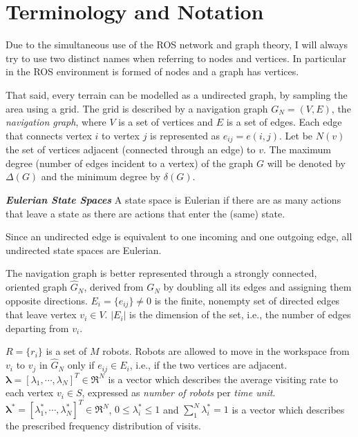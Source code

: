 \section{Terminology and Notation}\label{sec:terminology}

Due to the simultaneous use of the ROS network and graph theory, I will always try to use two distinct names when referring to nodes and vertices. In particular in the ROS environment is formed of nodes and a graph has vertices.

That said, every terrain can be modelled as a undirected graph, by sampling the area using a grid.
The grid is described by a navigation graph $G_N=(V,E)$, the \emph{navigation graph}, where $V$ is a set of vertices and $E$ is a set of edges. Each edge that connects vertex $i$ to vertex $j$ is represented as $e_{ij}=e(i,j)$. Let be $N(v)$ the set of vertices adjacent (connected through an edge) to $v$. The maximum degree (number of edges incident to a vertex) of the graph $G$ will be denoted by $\Delta (G)$ and the minimum degree by $\delta (G)$.


\theoremstyle{definition}
\begin{definition}{\textbf{\textit{Eulerian State Spaces}}}\label{cellDec}
A state space is Eulerian if  there are as many actions  that leave a state as there are actions that enter the (same) state.
\end{definition}

Since an undirected edge is equivalent to one incoming and one outgoing edge, all undirected state spaces are Eulerian.

The navigation graph is better represented through a strongly connected, oriented graph $\hat{G}_N$, derived from $G_N$ by doubling all its edges and assigning them opposite directions. 
$E_i=\{e_{ij}\} \neq 0$ is the finite, nonempty set of directed edges that leave vertex $v_i \in V$.  $|E_i|$ is the dimension of the set, i.e., the number of edges departing from $v_i$.

$R=\{r_i\}$ is a set of $M$ robots. Robots are allowed to move in the workspace from $v_i$ to $v_j$ in $\hat{G}_N$ only if $e_{ij} \in E_i$, i.e., if the two vertices are adjacent. 
${\bm{\lambda}}=[\lambda_1,\cdots,\lambda_N]^T  \in \Re^N$ is a vector which describes the average visiting rate to each vertex $v_i \in S$, expressed as \textit{number of robots} per \textit{time unit}. %
${\bm{\lambda}}^*=[\lambda_1^*,\cdots,\lambda_N^*]^T  \in \Re^N$, $0 \le \lambda_i^* \le 1$ and $\sum \nolimits_1^N \lambda_i^* =1$ is a vector which describes the prescribed frequency distribution of visits. 

